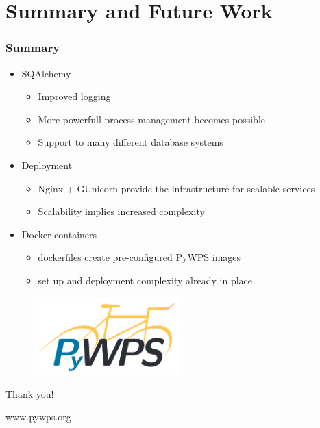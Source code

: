 \documentclass{beamer}
\begin{document}
\section{Summary and Future Work}

\begin{frame}
\frametitle<presentation>{Summary}

\begin{itemize}
  \item SQAlchemy
  \begin{itemize} 
    \item Improved logging 
    \item More powerfull process management becomes possible
    \item Support to many different database systems
  \end{itemize} 
  \item Deployment   
  \begin{itemize} 
    \item Nginx + GUnicorn provide the infrastructure for scalable services
    \item Scalability implies increased complexity
  \end{itemize} 
  \item{Docker containers}
  \begin{itemize} 
    \item dockerfiles create pre-configured PyWPS images
    \item set up and deployment complexity already in place
  \end{itemize} 
\end{itemize}

\end{frame}

\begin{frame}

  \begin{figure}[ht]
   \centering
   \includegraphics[height=3cm]{figures/pywps}
  \end{figure}

\centering
\Huge{Thank you!}

\vspace{0.4cm}
\normalsize{www.pywps.org}
\end{frame}
\end{document}
